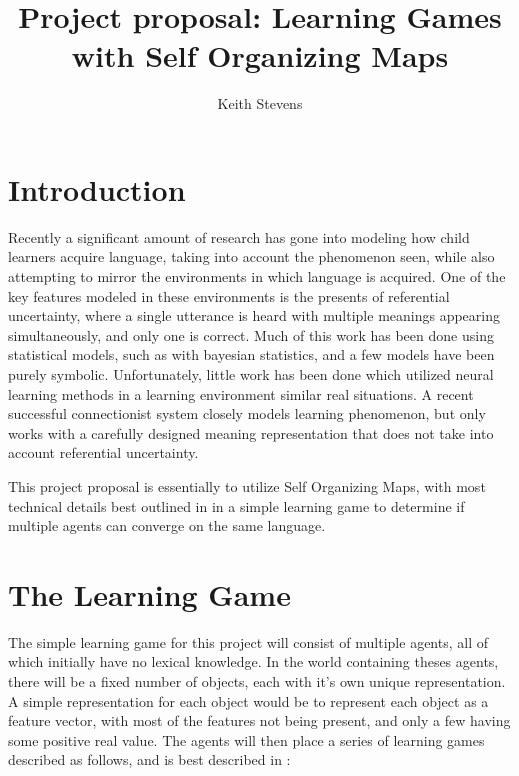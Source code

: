 \documentclass[11pt]{article}
\title{Project proposal: Learning Games with Self Organizing Maps}
\author{Keith Stevens}
\begin{document}
\maketitle

\section{Introduction}
Recently a significant amount of research has gone into modeling how child
learners acquire language, taking into account the phenomenon seen, while also
attempting to mirror the environments in which language is acquired.  One of the
key features modeled in these environments is the presents of referential
uncertainty, where a single utterance is heard with multiple meanings appearing
simultaneously, and only one is correct.  Much of
this work has been done using statistical models, such as with bayesian
statistics, and a few models have been purely symbolic.  Unfortunately, little
work has been done which utilized neural learning methods in a learning
environment similar real situations.  A recent successful connectionist system
\cite{liDevLex} closely models learning phenomenon, but only works with a
carefully designed meaning representation that does not take into account
referential uncertainty.

This project proposal is essentially to utilize Self Organizing Maps, with most
technical details best outlined in
\cite{liDevLex} in a simple learning game to determine if multiple agents can
converge on the same language.

\section{The Learning Game}
The simple learning game for this project will consist of multiple agents, all
of which initially have no lexical knowledge.  In the world containing theses
agents, there will be a fixed number of objects, each with it's own unique
representation.  A simple representation for each object would be to represent
each object as a feature vector, with most of the features not being present,
and only a few having some positive real value.  
The agents will then place a series of learning games described as follows, and is best described in \cite{vogtLearningSim}: 
\end{document}
